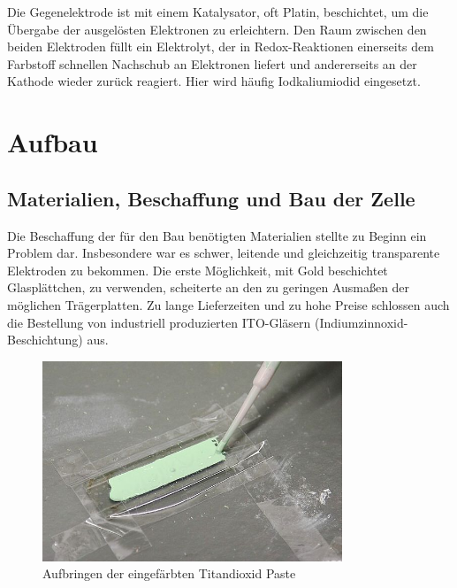 \documentclass[11pt]{scrartcl}
\begin{document}
Die Gegenelektrode ist mit einem Katalysator, oft Platin, beschichtet, um die \"Ubergabe der ausgel\"osten Elektronen zu erleichtern. Den Raum zwischen den beiden Elektroden f\"ullt ein Elektrolyt, der in Redox-Reaktionen einerseits dem Farbstoff schnellen Nachschub an Elektronen liefert und andererseits an der Kathode wieder zur\"uck reagiert. Hier wird h\"aufig Iodkaliumiodid eingesetzt.





\section{Aufbau}
\subsection{Materialien, Beschaffung und Bau der Zelle}
Die Beschaffung der f\"ur den Bau ben\"otigten Materialien stellte zu Beginn ein Problem dar. Insbesondere war es schwer, leitende und gleichzeitig transparente Elektroden zu bekommen. Die erste M\"oglichkeit, mit Gold beschichtet Glaspl\"attchen, zu verwenden, scheiterte an den zu geringen Ausma\ss{}en der m\"oglichen Tr\"agerplatten. Zu lange Lieferzeiten und zu hohe Preise schlossen auch die Bestellung von industriell produzierten ITO-Gl\"asern (Indiumzinnoxid-Beschichtung) aus.

\begin{figure}[ht]
\begin{center}
\includegraphics[width=0.8\textwidth]{images/herstellung_pipette.jpg}
\end{center}
\vspace{-1.5\baselineskip}
\caption{Aufbringen der eingefärbten Titandioxid Paste}
\label{herstellung_pipette}
\end{figure}
\end{document}
